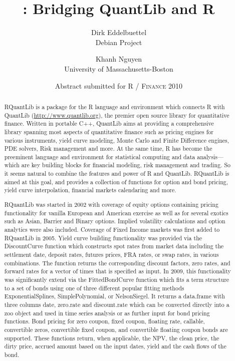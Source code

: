 \documentclass[11pt]{article}
\author{Dirk Eddelbuettel\\Debian Project 
  \and Khanh Nguyen\\University of Massachusetts-Boston}
\title{\pkg{RQuantLib}: Bridging QuantLib and R}
\date{Abstract submitted for \textsc{R / Finance 2010}}
\let\proglang=\textsf
\newcommand{\pkg}[1]{{\fontseries{b}\selectfont #1}}
\begin{document}
\maketitle

\begin{abstract}
  \noindent %
  \addtolength{\parskip}{\baselineskip} %
  \pkg{RQuantLib} is a package for the \proglang{R} language and environment
  which connects \proglang{R} with QuantLib (\url{http://www.quantlib.org}),
  the premier open source library for quantitative finance. Written in
  portable \proglang{C++}, QuantLib aims at providing a comprehensive library
  spanning most aspects of quantitative finance such as pricing engines for
  various instruments, yield curve modeling, Monte Carlo and Finite
  Difference engines, PDE solvers, Risk management and more. At the same
  time, \proglang{R} has become the preeminent language and environment for
  statistical computing and data analysis---which are key building blocks for
  financial modeling, risk management and trading. So it seems natural to
  combine the features and power of \proglang{R} and QuantLib.
  \pkg{RQuantLib} is aimed at this goal, and provides a collection of
  functions for option and bond pricing, yield curve interpolation, financial
  markets calendaring and more.

  \pkg{RQuantLib} was started in 2002 with coverage of equity options
  containing pricing functionality for vanilla European and American exercise
  as well as for several exotics such as Asian, Barrier and Binary options.
  Implied volatility calculations and option analytics were also included.
  Coverage of Fixed Income markets was first added to \pkg{RQuantLib} in
  2005. Yield curve building functionality was provided via the DiscountCurve
  function which constructs spot rates from market data including the
  settlement date, deposit rates, futures prices, FRA rates, or swap rates,
  in various combinations. The function returns the corresponding discount
  factors, zero rates, and forward rates for a vector of times that is
  specified as input. In 2009, this functionality was significantly extend
  via the FittedBondCurve function which fits a term structure to a set of
  bonds using one of three different popular fitting methods
  ExponentialSplines, SimplePolynomial, or NelsonSiegel.  It returns a
  data.frame with three columns date, zero.rate and discount.rate which can
  be converted directly into a \pkg{zoo} object and used in time series
  analysis or as further input for bond pricing functions. Bond pricing for
  zero coupon, fixed coupon, floating rate, callable, convertible zeros,
  convertible fixed coupon, and convertible floating coupon bonds are
  supported. These functions return, when applicable, the NPV, the clean
  price, the dirty price, accrued amount based on the input dates, yield and
  the cash flows of the bond.


\end{abstract}
\end{document}
